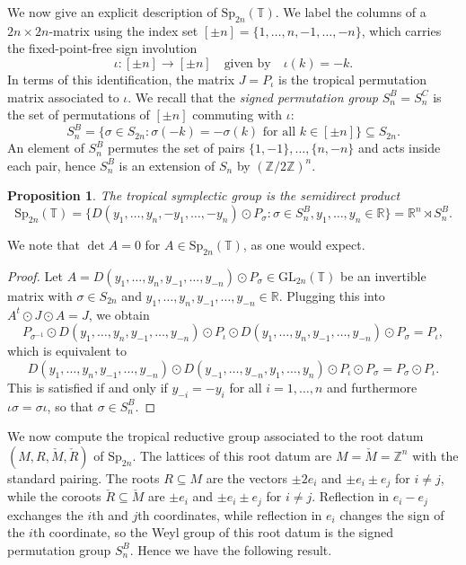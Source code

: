 \documentclass[10pt, a4paper]{amsart}
\newtheorem{proposition}[theorem]{Proposition}
\theoremstyle{definition}
\theoremstyle{myitemstyle}
\newcommand{\R}{\mathbb{R}}
\newcommand{\ZZ}{\mathbb{Z}}
\newcommand{\RR}{\mathbb{R}}
\newcommand{\TT}{\mathbb{T}}
\newcommand{\T}{\mathbb{T}}
\newcommand{\Mcheck}{{\check{M}}}
\newcommand{\Rcheck}{\check{R}}
\newcommand{\GL}{{\mathrm{GL}}}
\newcommand{\Sp}{{\mathrm{Sp}}}
\begin{document}
We now give an explicit description of $\Sp_{2n}(\TT)$. We label the columns of a $2n\times 2n$-matrix using the index set $[\pm n]=\{1,\ldots,n,-1,\ldots,-n\}$, which carries the fixed-point-free sign involution
\begin{equation*}
\iota:[\pm n]\to [\pm n] \quad \text{given by} \quad \iota(k)=-k.
\end{equation*}
In terms of this identification, the matrix $J=P_{\iota}$ is the tropical permutation matrix associated to $\iota$. We recall that the \emph{signed permutation group} $S^B_n=S^C_n$ is the set of permutations of $[\pm n]$ commuting with $\iota$: 
\[
S^B_n = \big\{\sigma\in S_{2n}: \sigma(-k) = - \sigma(k)\mbox{ for all }k\in [\pm n ] \big\} \subseteq S_{2n}.
\]
An element of $S_n^B$ permutes the set of pairs $\{1,-1\},\ldots,\{n,-n\}$ and acts inside each pair, hence $S_n^B$ is an extension of $S_n$ by $(\ZZ/2\ZZ)^n$. 

\begin{proposition} The tropical symplectic group is the semidirect product
\[
\Sp_{2n}(\T) = \big\{D(y_1,\ldots,y_n,-y_1,\ldots,-y_n)\odot P_{\sigma}
:\sigma \in S_n^B, y_1,\ldots,y_n \in \RR\big\}=\R^n\rtimes S_n^B.
\]
\end{proposition} 

We note that $\det A=0$ for $A\in \Sp_{2n}(\TT)$, as one would expect.

\begin{proof}
    Let  $A =  D(y_1,\ldots,y_n,y_{-1},\ldots,y_{-n}) \odot P_{\sigma} \in \GL_{2n}(\T)$ be an invertible matrix with $\sigma \in S_{2n}$ and $y_1,\ldots,y_n,y_{-1},\ldots,y_{-n} \in \RR$. Plugging this into $A^t \odot J \odot A=J$, we obtain
    \[
     P_{\sigma^{-1}} \odot D(y_1,\ldots,y_n,y_{-1},\ldots,y_{-n})\odot P_\iota \odot  D(y_1,\ldots,y_n,y_{-1},\ldots,y_{-n}) \odot P_{\sigma} = P_{\iota},
    \]
    which is equivalent to
\[
       D(y_1,\ldots,y_n,y_{-1},\ldots,y_{-n})\odot D(y_{-1},\ldots,y_{-n},y_{1},\ldots,y_{n}) \odot P_{\iota} \odot P_{\sigma} = P_{\sigma} \odot P_{\iota}.
    \]
This is satisfied if and only if $y_{-i}=-y_i$ for all $i=1,\ldots,n$ and furthermore $\iota\sigma=\sigma \iota$, so that $\sigma\in S_n^B$. \end{proof}


We now compute the tropical reductive group associated to the root datum $(M,R,\Mcheck,\Rcheck)$ of $\Sp_{2n}$. The lattices of this root datum are $M=\Mcheck=\ZZ^n$ with the standard pairing. The roots $R\subseteq M$ are the vectors $\pm 2e_i$ and $\pm e_i\pm e_j$ for $i\neq j$, while the coroots $\Rcheck\subseteq \Mcheck$ are $\pm e_i$ and $\pm e_i\pm e_j$ for $i\neq j$. Reflection in $e_i-e_j$ exchanges the $i$th and $j$th coordinates, while reflection in $e_i$ changes the sign of the $i$th coordinate, so the Weyl group of this root datum is the signed permutation group $S^B_n$. Hence we have the following result.
\end{document}
